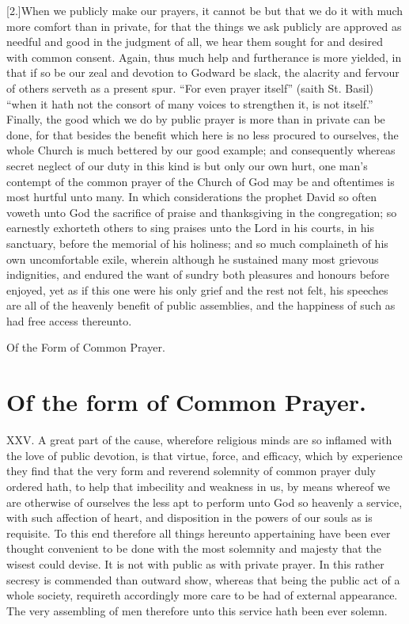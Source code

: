 [2.]When we publicly make our prayers, it cannot be but that we do it with much more comfort than in private, for that the things we ask publicly are approved as needful and good in the judgment of all, we hear them sought for and desired with common consent. Again, thus much help and furtherance is more yielded, in that if so be our zeal and devotion to Godward be slack, the alacrity and fervour of others serveth as a present spur. “For even prayer itself” (saith St. Basil) “when it hath not the consort of many voices to strengthen it, is not itself.” Finally, the good which we do  by public prayer is more than in private can be done, for that besides the benefit which here is no less procured to ourselves, the whole Church is much bettered by our good example;
 and consequently whereas secret neglect of our duty in this kind is but only our own hurt, one man’s contempt of the common prayer of the Church of God may be and oftentimes is most hurtful unto many. In which considerations the prophet David so often voweth unto God the sacrifice of praise and thanksgiving in the congregation; so earnestly exhorteth others to sing praises unto the Lord in his courts, in his sanctuary, before the memorial of his holiness; and so much complaineth of his own uncomfortable exile, wherein although he sustained many most grievous indignities, and endured the want of sundry both pleasures and honours before enjoyed, yet as if this one were his only grief and the rest not felt, his speeches are all of the heavenly benefit of public assemblies, and the happiness of such as had free access thereunto.


Of the Form of Common Prayer.
\section*{Of the form of Common Prayer.}
XXV. A great part of the cause, wherefore religious minds are so inflamed with the love of public devotion, is that virtue, force, and efficacy, which by experience they find that the very form and reverend solemnity of common prayer duly ordered hath, to help that imbecility and weakness in us, by means whereof we are otherwise of ourselves the less apt to perform unto God so heavenly a service, with such affection of heart, and disposition in the powers of our souls as is requisite. To this end therefore all things hereunto appertaining have been ever thought convenient to be done with the most solemnity and majesty that the wisest could devise. It is not with public as with private prayer. In this rather secresy is commended than outward show, whereas that being the public act of a whole society, requireth accordingly more care to be had of external appearance. The very assembling of men therefore unto this service hath been ever solemn.

